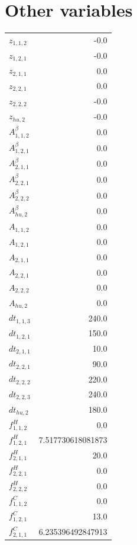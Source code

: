 \documentclass{article}%
\makeatletter
\let\mcnewpage=\newpage%
\newcommand{\TrickSupertabularIntoMulticols}{%
\renewcommand\newpage{%
\if@firstcolumn%
\hrule width\linewidth height0pt%
\columnbreak%
\else%
\mcnewpage%
\fi%
}%
}%
\makeatother
\begin{document}
\section{Other variables}%
\thispagestyle{plain}%
\begin{multicols*}{3}%
\TrickSupertabularIntoMulticols%
%
\begin{supertabular}{lr}%
	$z_{1,1,2}$ & -0.0 \\%
	$z_{1,2,1}$ & -0.0 \\%
	$z_{2,1,1}$ & 0.0 \\%
	$z_{2,2,1}$ & 0.0 \\%
	$z_{2,2,2}$ & -0.0 \\%
	$z_{hu,2}$ & -0.0 \\%
	$A_{1,1,2}^{\beta}$ & 0.0 \\%
	$A_{1,2,1}^{\beta}$ & 0.0 \\%
	$A_{2,1,1}^{\beta}$ & 0.0 \\%
	$A_{2,2,1}^{\beta}$ & 0.0 \\%
	$A_{2,2,2}^{\beta}$ & 0.0 \\%
	$A_{hu,2}^{\beta}$ & 0.0 \\%
	$A_{1,1,2}$ & 0.0 \\%
	$A_{1,2,1}$ & 0.0 \\%
	$A_{2,1,1}$ & 0.0 \\%
	$A_{2,2,1}$ & 0.0 \\%
	$A_{2,2,2}$ & 0.0 \\%
	$A_{hu,2}$ & 0.0 \\%
	$dt_{1,1,3}$ & 240.0 \\%
	$dt_{1,2,1}$ & 150.0 \\%
	$dt_{2,1,1}$ & 10.0 \\%
	$dt_{2,2,1}$ & 90.0 \\%
	$dt_{2,2,2}$ & 220.0 \\%
	$dt_{2,2,3}$ & 240.0 \\%
	$dt_{hu,2}$ & 180.0 \\%
	$f_{1,1,2}^{H}$ & 0.0 \\%
	$f_{1,2,1}^{H}$ & 7.517730618081873 \\%
	$f_{2,1,1}^{H}$ & 20.0 \\%
	$f_{2,2,1}^{H}$ & 0.0 \\%
	$f_{2,2,2}^{H}$ & 0.0 \\%
	$f_{1,1,2}^{C}$ & 0.0 \\%
	$f_{1,2,1}^{C}$ & 13.0 \\%
	$f_{2,1,1}^{C}$ & 6.235396492847913 \\%

\end{supertabular}
\end{multicols*}
\end{document}
